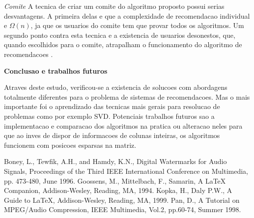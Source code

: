 \documentclass[a4paper,10pt]{article}
\begin{document}
\textit{Comite}
A tecnica de criar um comite do algoritmo proposto possui serias
desvantagens. 
A primeira delas e que a complexidade de recomendacao individual
e $\Omega(n)$, ja que os usuarios do comite tem que provar todos os
algoritmos. 
Um segundo ponto contra esta tecnica e a existencia de usuarios desonestos,
que, quando escolhidos para o comite, atrapalham o funcionamento do 
algoritmo de recomendacoes \cite{Boney96}.

\textbf{Conclusao e trabalhos futuros}

Atraves deste estudo, verificou-se a existencia de solucoes com abordagens
totalmente diferentes para o problema de sistemas de recomendacoes. Mas o mais
importante foi o aprendizado das tecnicas mais gerais para resolucao de problemas
como por exemplo SVD. 
Potenciais trabalhos futuros sao a implementacao e comparacao dos algoritmos na pratica
ou alteracao neles para que ao inves de dispor de informacoes de colunas inteiras, os
algoritmos funcionem com posicoes esparsas na matriz. 


\begin{thebibliography}
     Boney, L., Tewfik, A.H., and Hamdy, K.N., Digital 
        Watermarks for Audio Signals, Proceedings of the Third IEEE
        International Conference on Multimedia, pp. 473-480, June 1996.
     Goossens, M., Mittelbach, F., Samarin, A LaTeX Companion, Addison-Wesley, Reading, MA, 1994.
     Kopka, H., Daly P.W., A Guide to LaTeX, Addison-Wesley, Reading, MA, 1999.
     Pan, D., A Tutorial on MPEG/Audio Compression, IEEE Multimedia, Vol.2, pp.60-74, Summer 1998.
\end{thebibliography}
\end{document}
